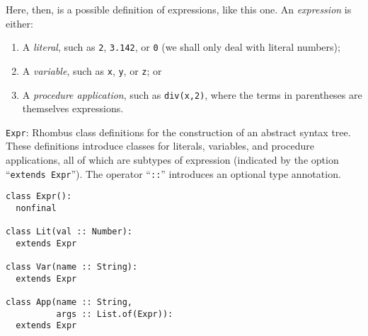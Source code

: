 \documentclass[11pt, a4paper]{article}
\newcommand{\cd}[1]{\texttt{#1}}
\begin{document}
Here, then, is a possible definition of expressions, like this one. An
\emph{expression} is either:
\begin{enumerate}
\item A \emph{literal}, such as \cd{2}, \cd{3.142}, or \cd{0} (we
  shall only deal with literal numbers);
\item A \emph{variable}, such as \cd{x}, \cd{y}, or \cd{z}; or
\item A \emph{procedure application}, such as \cd{div(x,2)}, where the
  terms in parentheses are themselves expressions.
\end{enumerate}
\begin{marginfigure}
  \caption{\cd{Expr}: Rhombus class definitions for the construction
    of an abstract syntax tree. These definitions introduce classes
    for literals, variables, and procedure applications, all of which
    are subtypes of expression (indicated by the option ``\cd{extends
      Expr}''). The operator ``\cd{::}'' introduces an optional type
    annotation.\label{fig:class-defs}}\footnotesize
\begin{verbatim}
class Expr():
  nonfinal

class Lit(val :: Number):
  extends Expr

class Var(name :: String):
  extends Expr

class App(name :: String,
          args :: List.of(Expr)):
  extends Expr
\end{verbatim}
\end{marginfigure}
\end{document}
